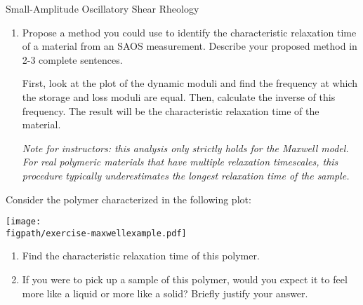 \begin{activity}[extension]{Small-Amplitude Oscillatory Shear Rheology}
\begin{ctqs}
\begin{enumerate}
			\item Propose a method you could use to identify the characteristic relaxation time of a material from an SAOS measurement.  Describe your proposed method in 2-3 complete sentences.
			
				\begin{solution}[2.5in]
					First, look at the plot of the dynamic moduli and find the frequency at which the storage and loss moduli are equal.					
					Then, calculate the inverse of this frequency.  The result will be the characteristic relaxation time of the material.
					
					\emph{Note for instructors: this analysis only strictly holds for the Maxwell model.  For real polymeric materials that have multiple relaxation timescales, this procedure typically \emph{underestimates} the longest relaxation time of the sample.}
				\end{solution}
			
		\end{enumerate}
	
\end{ctqs}
	

\clearpage
\begin{exercises}

\exercise Consider the polymer characterized in the following plot:
				
		\centerline{\texttt{[image: \\figpath/exercise-maxwellexample.pdf]}}
		
		\begin{enumerate}
		
			\item Find the characteristic relaxation time of this polymer.
	
					\begin{solution}\end{solution}
	
			\item If you were to pick up a sample of this polymer, would you expect it to feel more like a liquid or more like a solid?  Briefly justify your answer.
	

\end{enumerate}
\end{exercises}
\end{activity}
